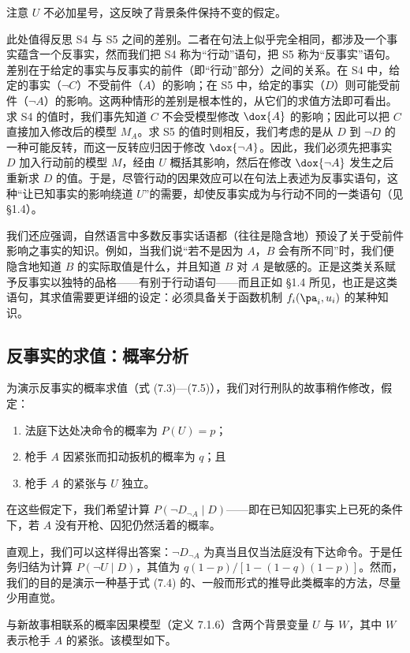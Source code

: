 注意 $U$ 不必加星号，这反映了背景条件保持不变的假定。

此处值得反思 S4 与 S5 之间的差别。二者在句法上似乎完全相同，都涉及一个事实蕴含一个反事实，然而我们把 S4 称为“行动”语句，把 S5 称为“反事实”语句。差别在于给定的事实与反事实的前件（即“行动”部分）之间的关系。在 S4 中，给定的事实（$\neg C$）不受前件（$A$）的影响；在 S5 中，给定的事实（$D$）则可能受前件（$\neg A$）的影响。这两种情形的差别是根本性的，从它们的求值方法即可看出。求 S4 的值时，我们事先知道 $C$ 不会受模型修改 $\dox{A}$ 的影响；因此可以把 $C$ 直接加入修改后的模型 $M_A$。求 S5 的值时则相反，我们考虑的是从 $D$ 到 $\neg D$ 的一种可能反转，而这一反转应归因于修改 $\dox{\neg A}$。因此，我们必须先把事实 $D$ 加入行动前的模型 $M$，经由 $U$ 概括其影响，然后在修改 $\dox{\neg A}$ 发生之后重新求 $D$ 的值。于是，尽管行动的因果效应可以在句法上表述为反事实语句，这种“让已知事实的影响绕道 $U$”的需要，却使反事实成为与行动不同的一类语句（见 \S 1.4）。

我们还应强调，自然语言中多数反事实话语都（往往是隐含地）预设了关于受前件影响之事实的知识。例如，当我们说“若不是因为 $A$，$B$ 会有所不同”时，我们便隐含地知道 $B$ 的实际取值是什么，并且知道 $B$ 对 $A$ 是敏感的。正是这类关系赋予反事实以独特的品格——有别于行动语句——而且正如 \S 1.4 所见，也正是这类语句，其求值需要更详细的设定：必须具备关于函数机制 $f_i(\pa_i,u_i)$ 的某种知识。

\subsection{反事实的求值：概率分析}

为演示反事实的概率求值（式 \textup{(7.3)}—\textup{(7.5)}），我们对行刑队的故事稍作修改，假定：
\begin{enumerate}[label=\arabic*.,leftmargin=1.8em]
\item 法庭下达处决命令的概率为 $P(U)=p$；
\item 枪手 $A$ 因紧张而扣动扳机的概率为 $q$；且
\item 枪手 $A$ 的紧张与 $U$ 独立。
\end{enumerate}
在这些假定下，我们希望计算 $P(\neg D_{\neg A}\mid D)$——即在已知囚犯事实上已死的条件下，若 $A$ 没有开枪、囚犯仍然活着的概率。

直观上，我们可以这样得出答案：$\neg D_{\neg A}$ 为真当且仅当法庭没有下达命令。于是任务归结为计算 $P(\neg U\mid D)$，其值为 $q(1-p)/[1-(1-q)(1-p)]$。然而，我们的目的是演示一种基于式 \textup{(7.4)} 的、一般而形式的推导此类概率的方法，尽量少用直觉。

与新故事相联系的概率因果模型（定义 7.1.6）含两个背景变量 $U$ 与 $W$，其中 $W$ 表示枪手 $A$ 的紧张。该模型如下。

